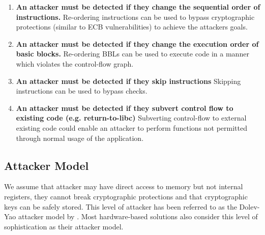 \begin{enumerate}
	\item \textbf{An attacker must be detected if they change the sequential order of instructions.} Re-ordering instructions can be used to bypass cryptographic protections (similar to ECB vulnerabilities) to achieve the attackers goals.
	\item \textbf{An attacker must be detected if they change the execution order of basic blocks.} Re-ordering BBLs can be used to execute code in a manner which violates the control-flow graph.
	\item \textbf{An attacker must be detected if they skip instructions} Skipping instructions can be used to bypass checks.
	\item \textbf{An attacker must be detected if they subvert control flow to existing code (e.g. return-to-libc)} Subverting control-flow to external existing code could enable an attacker to perform functions not permitted through normal usage of the application.
\end{enumerate}

\subsection{Attacker Model}
We assume that attacker may have direct access to memory but not internal registers, they cannot break cryptographic protections and that cryptographic keys can be safely stored. This level of attacker has been referred to as the Dolev-Yao attacker model \cite{Dolev1981} by \cite{Lee2019}. Most hardware-based solutions also consider this level of sophistication as their attacker model.